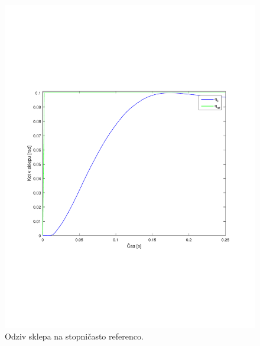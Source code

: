 \begin{figure}
	\centering
	\includegraphics[trim={0 6cm 0 7cm},scale=0.5]{./Slike/follow_step_vel_zoom.pdf}
	\caption{Odziv sklepa na stopni\v{c}asto referenco.}
	\label{fig:follow_step_vel_zoom}
\end{figure}
